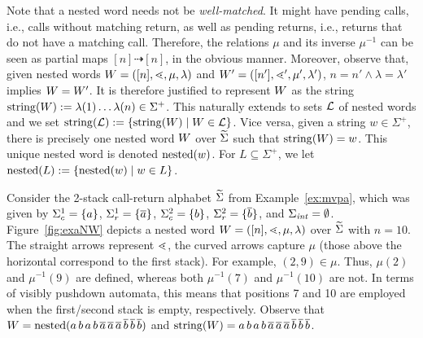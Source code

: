 \documentclass{LMCS}
\begin{document}
Note that a nested word needs not be \emph{well-matched}. It might have
pending calls, i.e., calls without matching return, as well as pending
returns, i.e., returns that do not have a matching call. Therefore, the
relations $\mu$ and its inverse $\mu^{-1}$ can be seen as partial maps $[n]
\dashrightarrow [n]$, in the obvious manner. Moreover, observe that, given
nested words $W=([n],\mathord{\lessdot},\mu,\lambda)$ and
$W'=([n'],\mathord{\lessdot}',\mu',\lambda')$, $n=n' \mathrel{\wedge}
\lambda=\lambda'$ implies $W = W'$. It is therefore justified to
represent $W$ as the string $\mathrm{string}(W) := \lambda(1) \ldots \lambda(n)
\in \Sigma^+$. This naturally extends to sets $\mathcal{L}$ of nested words and we
set $\mathrm{string}(\mathcal{L}) := \{\mathrm{string}(W) \mid W \in \mathcal{L}\}$. Vice versa, given a string
$w \in \Sigma^+$, there is precisely one nested word $W$ over $\widetilde{\Sigma}$
such that $\mathrm{string}(W) = w$. This unique nested word is denoted $\mathrm{nested}(w)$.
For $L \subseteq \Sigma^+$, we let $\mathrm{nested}(L) := \{\mathrm{nested}(w) \mid w \in
L\}$.





\begin{exa}\label{ex:exaNW}
  Consider the 2-stack call-return alphabet $\widetilde{\Sigma}$ from
  Example~\ref{ex:mvpa}, which was given by $\Sigma_c^1 = \{ a \}$, $\Sigma_r^1
  = \{ {\overline{a}} \}$, $\Sigma_c^2 = \{ b\}$, $\Sigma_r^2 = \{ {\overline{b}} \}$, and $\Sigma_{\mathit{int}}
  = \emptyset$. Figure~\ref{fig:exaNW} depicts a nested word
  $W=([n],\mathord{\lessdot},\mu,\lambda)$ over $\widetilde{\Sigma}$ with $n=10$. The straight
  arrows represent $\mathord{\lessdot}$, the curved arrows capture $\mu$ (those above
  the horizontal correspond to the first stack). For example, $(2,9) \in \mu$.
  Thus, $\mu(2)$ and $\mu^{-1}(9)$ are defined, whereas both $\mu^{-1}(7)$ and
  $\mu^{-1}(10)$ are not. In terms of visibly pushdown automata, this means
  that positions 7 and 10 are employed when the first/second stack is empty,
  respectively. Observe that $W=\mathrm{nested}( a\, b\, a\, b\, {\overline{a}}\, {\overline{a}}\, {\overline{a}}\,
  {\overline{b}}\, {\overline{b}}\, {\overline{b}})$ and $\mathrm{string}(W)= a\, b\, a\, b\, {\overline{a}}\, {\overline{a}}\, {\overline{a}}\, {\overline{b}}\,
  {\overline{b}}\, {\overline{b}} $.
\end{exa}
\end{document}

